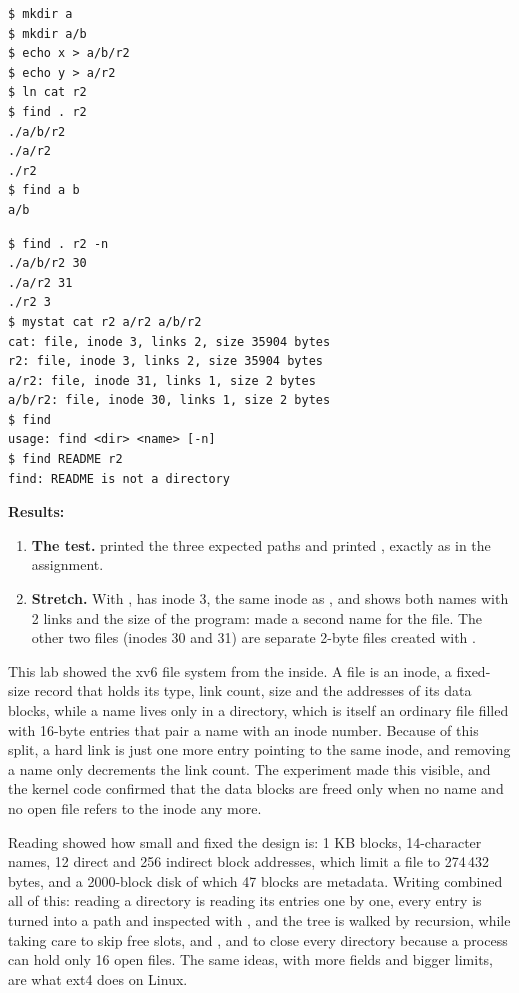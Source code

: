 \documentclass[11pt,a4paper]{article}
\begin{document}
\begin{lstlisting}[caption={Testing find on a fresh disk}]
$ mkdir a
$ mkdir a/b
$ echo x > a/b/r2
$ echo y > a/r2
$ ln cat r2
$ find . r2
./a/b/r2
./a/r2
./r2
$ find a b
a/b
\end{lstlisting}

\begin{lstlisting}[caption={Stretch: inode numbers with -n, and the error cases}]
$ find . r2 -n
./a/b/r2 30
./a/r2 31
./r2 3
$ mystat cat r2 a/r2 a/b/r2
cat: file, inode 3, links 2, size 35904 bytes
r2: file, inode 3, links 2, size 35904 bytes
a/r2: file, inode 31, links 1, size 2 bytes
a/b/r2: file, inode 30, links 1, size 2 bytes
$ find
usage: find <dir> <name> [-n]
$ find README r2
find: README is not a directory
\end{lstlisting}

\textbf{Results:}
\begin{enumerate}
  \item \textbf{The test.}  printed the three expected paths and
   printed , exactly as in the assignment.
  \item \textbf{Stretch.} With ,  has inode 3, the same inode as
  , and  shows both names with 2 links and the size of the 
  program:  made  a second name for the  file. The other
  two  files (inodes 30 and 31) are separate 2-byte files created with .
\end{enumerate}


This lab showed the xv6 file system from the inside. A file is an inode, a fixed-size record
that holds its type, link count, size and the addresses of its data blocks, while a name lives
only in a directory, which is itself an ordinary file filled with 16-byte entries that pair a
name with an inode number. Because of this split, a hard link is just one more entry pointing to
the same inode, and removing a name only decrements the link count. The 
experiment made this visible, and the kernel code confirmed that the data blocks are freed only
when no name and no open file refers to the inode any more.

Reading  showed how small and fixed the design is: 1 KB blocks, 14-character
names, 12 direct and 256 indirect block addresses, which limit a file to 274\,432 bytes, and a
2000-block disk of which 47 blocks are metadata. Writing  combined all of this:
reading a directory is reading its entries one by one, every entry is turned into a path and
inspected with , and the tree is walked by recursion, while taking care to skip free
slots,  and , and to close every directory because a process can hold only 16
open files. The same ideas, with more fields and bigger limits, are what ext4 does on Linux.
\end{document}
